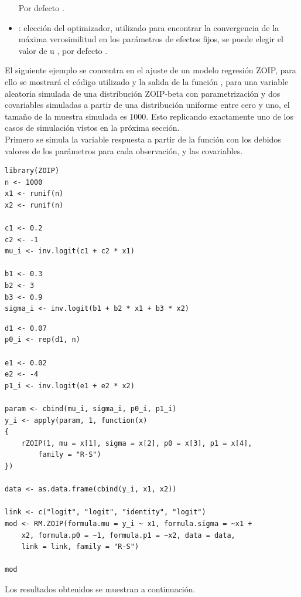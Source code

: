 \begin{itemize}[noitemsep, nolistsep]
Por defecto .
\item {}: elecci\'{o}n del optimizador, utilizado para encontrar la convergencia de la m\'{a}xima verosimilitud en los par\'{a}metros de efectos fijos, se puede elegir el valor de  u , por defecto .


\end{itemize}

El siguiente ejemplo se concentra en el ajuste de un modelo regresi\'{o}n ZOIP, para ello se mostrar\'{a} el c\'{o}digo utilizado y la salida de la funci\'{o}n , para una variable aleatoria simulada de una distribuci\'{o}n ZOIP-beta con parametrizaci\'{o}n \cite{Stasinopoulos2} y dos covariables simuladas a partir de una distribuci\'{o}n uniforme entre cero y uno, el tama\~{n}o de la muestra simulada es 1000. Esto replicando exactamente uno de los casos de simulaci\'{o}n vistos en la pr\'{o}xima secci\'{o}n.\\

Primero se simula la variable respuesta a partir de la funci\'{o}n  con los debidos valores de los par\'{a}metros para cada observaci\'{o}n, y las covariables.

\begin{verbatim}
library(ZOIP)
n <- 1000
x1 <- runif(n)
x2 <- runif(n)

c1 <- 0.2
c2 <- -1
mu_i <- inv.logit(c1 + c2 * x1)

b1 <- 0.3
b2 <- 3
b3 <- 0.9
sigma_i <- inv.logit(b1 + b2 * x1 + b3 * x2)
\end{verbatim}
\begin{verbatim}
d1 <- 0.07
p0_i <- rep(d1, n)

e1 <- 0.02
e2 <- -4
p1_i <- inv.logit(e1 + e2 * x2)

param <- cbind(mu_i, sigma_i, p0_i, p1_i)
y_i <- apply(param, 1, function(x)
{
    rZOIP(1, mu = x[1], sigma = x[2], p0 = x[3], p1 = x[4], 
        family = "R-S")
})

data <- as.data.frame(cbind(y_i, x1, x2))

link <- c("logit", "logit", "identity", "logit")
mod <- RM.ZOIP(formula.mu = y_i ~ x1, formula.sigma = ~x1 + 
    x2, formula.p0 = ~1, formula.p1 = ~x2, data = data, 
    link = link, family = "R-S")

mod
\end{verbatim}

Los resultados obtenidos se muestran a continuaci\'{o}n.


